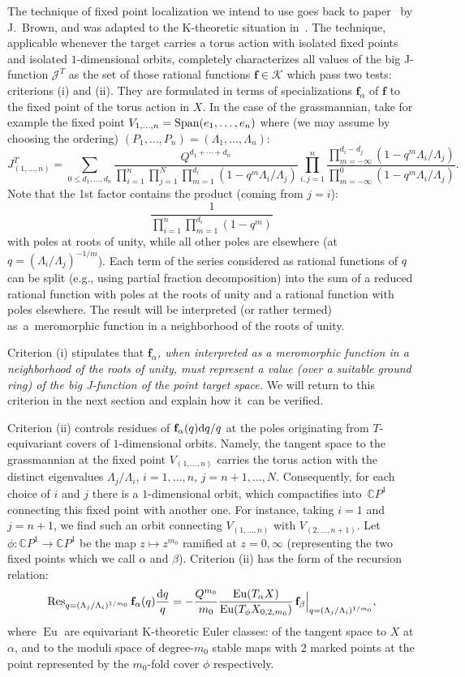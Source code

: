 \documentclass[pdftex]{sigma}
\numberwithin{equation}{section}
\def\K{\mathcal K}
\def\J{\mathcal J}
\def\CC{\mathbb C}
\def\Res{\operatorname{Res}}
\def\a{\alpha}
\def\b{\beta}
\def\f{{\mathbf f}}
\def\Eu{\operatorname{Eu}}
\begin{document}
The technique of fixed point localization we intend to use goes back to paper~\cite{Jeff_Brown} by
J.~Brown, and was adapted to the K-theoretic situation in~\cite{Givental:perm2}. The technique, applicable whenever the target carries a torus action with isolated fixed points and isolated $1$-dimensional orbits, completely characterizes all values of the big J-function $\J^T$ as the set of those rational functions $\f\in \K$ which pass two tests: criterions (i) and (ii). They are formulated in terms of specializations $\f_{\a}$ of $\f$ to the fixed point of the torus action in $X$. In the case of the grassmannian, take for example the fixed point $V_{1,\dots,n}=\mathop{\rm Span}(e_1,\dots,e_n)$ where (we may assume by choosing the ordering) $(P_1,\dots,P_n)=(\Lambda_1,\dots,\Lambda_n)$:
\[
J^T_{(1,\dots,n)}= \sum_{0\leq d_1,\dots,d_n} \frac{Q^{d_1+\cdots+d_n}}{\prod_{i=1}^n\prod_{j=1}^N\prod_{m=1}^{d_i}(1-q^m\Lambda_i/\Lambda_j)} \prod_{i,j=1}^n\frac{\prod_{m=-\infty}^{d_i-d_j}(1-q^m\Lambda_i/\Lambda_j)} {\prod_{m=-\infty}^0(1-q^m\Lambda_i/\Lambda_j)}.
\]
Note that the 1st factor contains the product (coming from $j=i$):
\[
\frac{1}{\prod_{i=1}^n \prod_{m=1}^{d_i}(1-q^m)}
\]
with poles at roots of unity, while all other poles are elsewhere (at $q=(\Lambda_i/\Lambda_j)^{-1/m}$). Each term of the series considered as rational functions of $q$ can be split (e.g., using partial fraction decomposition) into the sum of a reduced rational function with poles at the roots of unity and a rational function with poles elsewhere. The result will be interpreted (or rather termed) as~a~mero\-mor\-phic function in a neighborhood of the roots of unity.

Criterion (i) stipulates that {\em $\f_\a$, when interpreted as a meromorphic function in a neighborhood of the roots of unity, must represent a value (over a suitable ground ring) of the big J-function of the point target space.} We will return to this criterion in the next section and explain how it~can be verified.

Criterion (ii) controls residues of $\f_\a(q){\rm d}q/q$ at the poles originating from $T$-equivariant covers of $1$-dimensional orbits. Namely, the tangent space to the grassmannian at the fixed point $V_{(1,\dots,n)}$ carries the torus action with the distinct eigenvalues $\Lambda_j/\Lambda_i$, $i=1,\dots,n$, $j=n+1,\dots,N$. Consequently, for each choice of $i$ and $j$ there is a $1$-dimensional orbit, which
compactifies into~$\CC P^1$ connecting this fixed point with another one. For instance, taking $i=1$ and $j=n+1$, we find such an orbit connecting $V_{(1,\dots,n)}$ with $V_{(2,\dots,n+1)}$. Let $\phi\colon \CC P^1\to \CC P^1$ be the map $z\mapsto z^{m_0}$ ramified at $z=0,\infty$ (representing the two fixed points which we call $\a$ and $\b$). Criterion (ii) has the form of the recursion relation:
\[
\Res_{q=(\Lambda_j/\Lambda_i)^{1/m_0}}\f_\a(q) \frac{{\rm d}q}{q} = -\frac{Q^{m_0}}{m_0}
\frac{\Eu(T_\a X)}{\Eu(T_{\phi}X_{0,2,m_0})} \, \f_{\b}\Big|_{q=(\Lambda_j/\Lambda_i)^{1/m_0}},
\]
where $\Eu$ are equivariant K-theoretic Euler classes: of the tangent space to $X$ at $\a$, and to the moduli space of degree-$m_0$ stable maps with 2 marked points at the point represented by the $m_0$-fold cover $\phi$ respectively.
\end{document}
